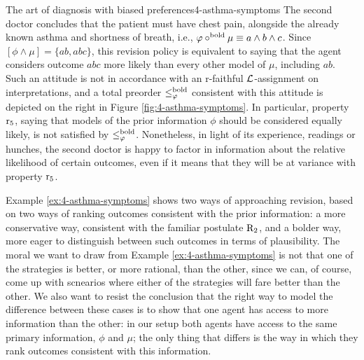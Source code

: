 \begin{xmpl}{The art of diagnosis with biased preferences}{4-asthma-symptoms}
	The second doctor concludes that the patient must 
	have chest pain, alongside the 
	already known asthma and shortness of breath,
	i.e., $\varphi\circ^{{\mathrm{bold}}}\mu\equiv a\land b\land c$.
	Since $[\phi\land\mu]=\{ab,abc\}$, this 
	revision policy is equivalent to saying that the
	agent considers outcome $abc$ more likely than every other 
	model of $\mu$, including $ab$.
	Such an attitude is not in accordance with an r-faithful 
	$\mathcal{L}$-assignment on interpretations,
	and a total preorder $\le^{{\mathrm{bold}}}_{\varphi}$ consistent with this 
	attitude is depicted on the right in Figure \ref{fig:4-asthma-symptoms}.
	In particular, property $\mathrm{r}_{5}$, saying that models 
	of the prior information $\phi$ should be considered 
	equally likely,
	is not satisfied by $\le^{{\mathrm{bold}}}_\varphi$.
	Nonetheless, in light of its experience, readings
	or hunches, the second doctor is happy to factor in information
	about the relative likelihood of certain outcomes,
	even if it means that they will be at variance with 
	property $\mathrm{r}_{5}$.
\end{xmpl}

Example \ref{ex:4-asthma-symptoms} shows two ways of approaching
revision, based on two ways of ranking outcomes consistent with the
prior information:
a more conservative way, consistent with the familiar postulate $\mathrm{R}_{2}$,
and a bolder way, more eager to distinguish between such outcomes in terms
of plausibility.
The moral we want to draw from Example \ref{ex:4-asthma-symptoms} 
is not that one of the strategies is 
better, or more rational, than the other, 
since we can, of course, come up with scnearios where 
either of the strategies will fare better than the other.
We also want to resist the conclusion that the right way to model
the difference between these cases is to show that one agent
has access to more information than the other: 
in our setup both agents have access to the same primary information,
$\phi$ and $\mu$; the only thing that differs is the way in which
they rank outcomes consistent with this information.

